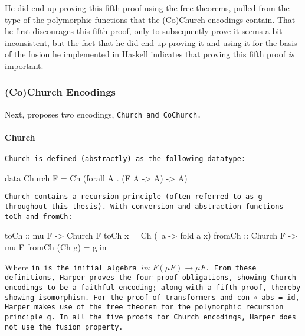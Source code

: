 He did end up proving this fifth proof using the free theorems, pulled from the type of the polymorphic functions that the (Co)Church encodings contain.
That he first discourages this fifth proof, only to subsequently prove it seems a bit inconsistent, but the fact that he did end up proving it and using it for the basis of the fusion he implemented in Haskell indicates that proving this fifth proof \textit{is} important.

\subsubsection{(Co)Church Encodings}
Next, \cite{Harper2011} proposes two encodings, \tt{Church} and \tt{CoChurch}.

\paragraph{Church} \tt{Church} is defined (abstractly) as the following datatype:
\begin{code}
data Church F = Ch (forall A . (F A -> A) -> A)
\end{code}
\tt{Church} contains a recursion principle (often referred to as \tt{g} throughout this thesis).
With conversion and abstraction functions \tt{toCh} and \tt{fromCh}:
\begin{code}
toCh :: mu F -> Church F
toCh x = Ch (\ a -> fold a x)
fromCh :: Church F -> mu F
fromCh (Ch g) = g in
\end{code}
Where \tt{in} is the initial algebra $in:F(\mu F) \to \mu F$.
From these definitions, Harper proves the four proof obligations, showing Church encodings to be a faithful encoding; along with a fifth proof, thereby showing isomorphism.
For the proof of transformers and \tt{con $\circ$ abs = id}, Harper makes use of the free theorem for the polymorphic recursion principle \tt{g}.
In all the five proofs for Church encodings, Harper does not use the fusion property.

